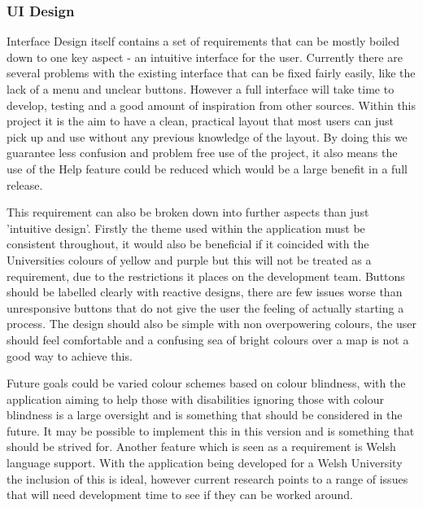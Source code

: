\subsubsection{UI Design}
Interface Design itself contains a set of requirements that can be mostly boiled down to one key aspect - an intuitive interface for the user. Currently there are several problems with the existing interface that can be fixed fairly easily, like the lack of a menu and unclear buttons. However a full interface will take time to develop, testing and a good amount of inspiration from other sources. Within this project it is the aim to have a clean, practical layout that most users can just pick up and use without any previous knowledge of the layout. By doing this we guarantee less confusion and problem free use of the project, it also means  the use of the Help feature could be reduced which would be a large benefit in a full release.

This requirement can also be broken down into further aspects than just 'intuitive design'. Firstly the theme used within the application must be consistent throughout, it would also be beneficial if it coincided with the Universities colours of yellow and purple but this will not be treated as a requirement, due to the restrictions it places on the development team. Buttons should be labelled clearly with reactive designs, there are few issues worse than unresponsive buttons that do not give the user the feeling of actually starting a process. The design should also be simple with non overpowering colours, the user should feel comfortable and a confusing sea of bright colours over a map is not a good way to achieve this.

Future goals could be varied colour schemes based on colour blindness, with the application aiming to help those with disabilities ignoring those with colour blindness is a large oversight and is something that should be considered in the future. It may be possible to implement this in this version and is something that should be strived for. Another feature which is seen as a requirement is Welsh language support. With the application being developed for a Welsh University the inclusion of this is ideal, however current research points to a range of issues that will need development time to see if they can be worked around. 

